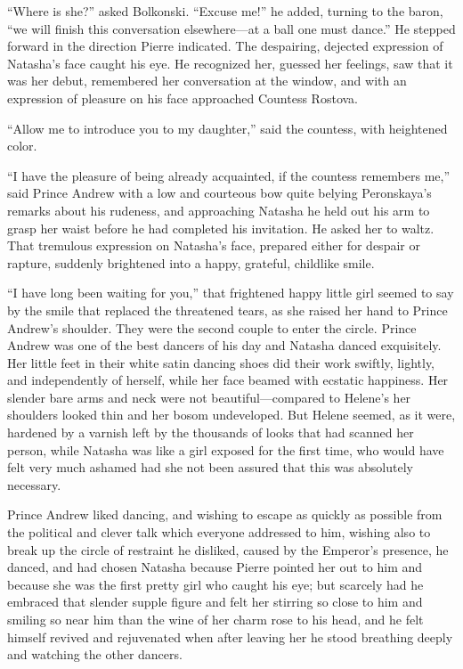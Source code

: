 ``Where is she?'' asked Bolkonski. ``Excuse me!'' he added,
turning to the baron, ``we will finish this conversation
elsewhere---at a ball one must dance.'' He stepped forward in the
direction Pierre indicated. The despairing, dejected expression
of Natasha's face caught his eye. He recognized her, guessed her
feelings, saw that it was her debut, remembered her conversation
at the window, and with an expression of pleasure on his face
approached Countess Rostova.

``Allow me to introduce you to my daughter,'' said the countess,
with heightened color.

``I have the pleasure of being already acquainted, if the
countess remembers me,'' said Prince Andrew with a low and
courteous bow quite belying Peronskaya's remarks about his
rudeness, and approaching Natasha he held out his arm to grasp
her waist before he had completed his invitation. He asked her to
waltz. That tremulous expression on Natasha's face, prepared
either for despair or rapture, suddenly brightened into a happy,
grateful, childlike smile.

``I have long been waiting for you,'' that frightened happy
little girl seemed to say by the smile that replaced the
threatened tears, as she raised her hand to Prince Andrew's
shoulder. They were the second couple to enter the circle. Prince
Andrew was one of the best dancers of his day and Natasha danced
exquisitely. Her little feet in their white satin dancing shoes
did their work swiftly, lightly, and independently of herself,
while her face beamed with ecstatic happiness. Her slender bare
arms and neck were not beautiful---compared to Helene's her
shoulders looked thin and her bosom undeveloped. But Helene
seemed, as it were, hardened by a varnish left by the thousands
of looks that had scanned her person, while Natasha was like a
girl exposed for the first time, who would have felt very much
ashamed had she not been assured that this was absolutely
necessary.

Prince Andrew liked dancing, and wishing to escape as quickly as
possible from the political and clever talk which everyone
addressed to him, wishing also to break up the circle of
restraint he disliked, caused by the Emperor's presence, he
danced, and had chosen Natasha because Pierre pointed her out to
him and because she was the first pretty girl who caught his eye;
but scarcely had he embraced that slender supple figure and felt
her stirring so close to him and smiling so near him than the
wine of her charm rose to his head, and he felt himself revived
and rejuvenated when after leaving her he stood breathing deeply
and watching the other dancers.

